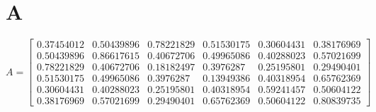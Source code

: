 \onecolumn
\setcounter{equation}{0}
\renewcommand\theequation{A.\arabic{equation}}
\section*{A}
\label{sec:appendix}

\begin{equation}\label{matrix:A}
A = \begin{bmatrix}
0.37454012 & 0.50439896 & 0.78221829 & 0.51530175 & 0.30604431 & 0.38176969 \\
0.50439896 & 0.86617615 & 0.40672706 & 0.49965086 & 0.40288023 & 0.57021699 \\
0.78221829 & 0.40672706 & 0.18182497 & 0.3976287  & 0.25195801 & 0.29490401 \\
0.51530175 & 0.49965086 & 0.3976287  & 0.13949386 & 0.40318954 & 0.65762369 \\
0.30604431 & 0.40288023 & 0.25195801 & 0.40318954 & 0.59241457 & 0.50604122 \\
0.38176969 & 0.57021699 & 0.29490401 & 0.65762369 & 0.50604122 & 0.80839735 
\end{bmatrix}
\end{equation}

